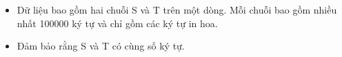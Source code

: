 \begin{itemize}
	\item     Dữ liệu bao gồm hai chuỗi S và T trên một dòng. Mỗi chuỗi bao gồm nhiều nhất 100000 ký tự và chỉ gồm các ký tự in hoa.   
	\item     Đảm bảo rằng S và T có cùng số ký tự.   
\end{itemize}